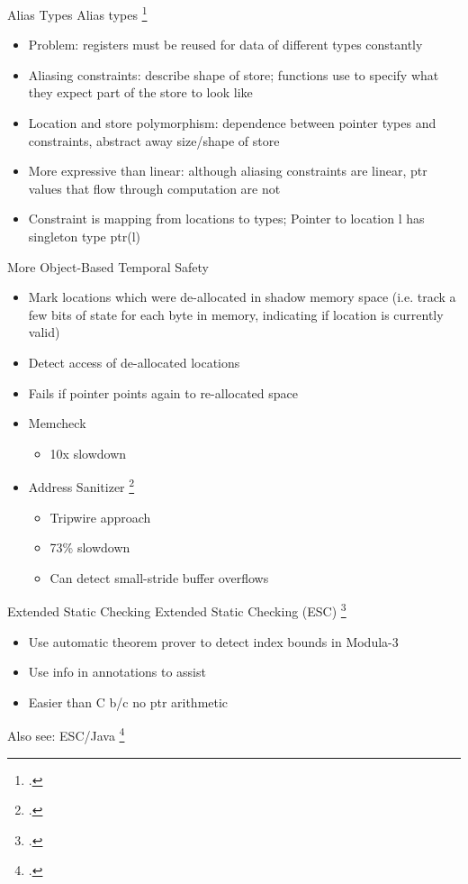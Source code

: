 \documentclass[aspectratio=169]{beamer}
\begin{document}
\begin{frame}{Alias Types}
  Alias types \footcite{smith_alias_2000}
    \begin{itemize}
        \item Problem: registers must be reused for data of different types constantly
        \item Aliasing constraints: describe shape of store; functions use to specify what they expect part of the store to look like
        \item Location and store polymorphism: dependence between pointer types and constraints, abstract away size/shape of store
        \item More expressive than linear: although aliasing constraints are linear, ptr values that flow through computation are not
        \item Constraint is mapping from locations to types; Pointer to location l has singleton type ptr(l)
    \end{itemize}
\end{frame}

\begin{frame}{More Object-Based Temporal Safety}
\begin{itemize}
\item Mark locations which were de-allocated in shadow memory space (i.e. track a few bits of state for each byte in memory, indicating if location is currently valid)
\item Detect access of de-allocated locations
\item Fails if pointer points again to re-allocated space
\item Memcheck
    \begin{itemize}
      \item 10x slowdown
    \end{itemize}
\item Address Sanitizer \footcite{serebryany_addresssanitizer:_2012}
    \begin{itemize}
        \item Tripwire approach
        \item 73\% slowdown
        \item Can detect small-stride buffer overflows
    \end{itemize}
\end{itemize}
\end{frame}

\begin{frame}[fragile]{Extended Static Checking}
Extended Static Checking (ESC) \footcite{detlefs_overview_1995}
    \begin{itemize}
      \item Use automatic theorem prover to detect index bounds in Modula-3
      \item Use info in annotations to assist
      \item Easier than C b/c no ptr arithmetic
    \end{itemize}
Also see: ESC/Java \footcite{flanagan_extended_2002}
\end{frame}
\end{document}

